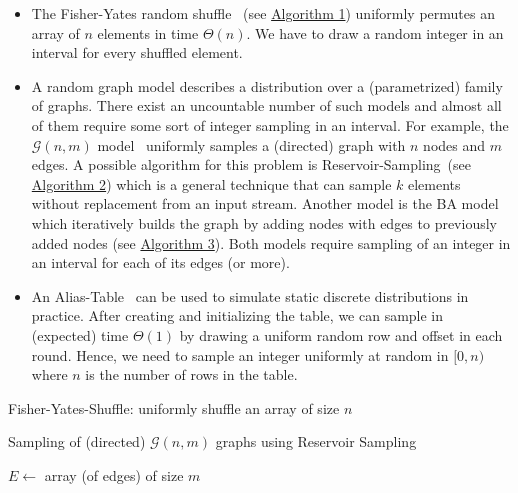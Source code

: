\documentclass[a4paper, UKenglish, cleveref, autoref, thm-restate]{lipics-v2021}
\begin{document}
\begin{itemize}
    \item The Fisher-Yates random shuffle~\cite{FY} (see \hyperref[alg:fy]{Algorithm 1}) uniformly permutes an array of $n$ elements in time $\Theta(n)$. 
    We have to draw a random integer in an interval for every shuffled element.
    \item A random graph model describes a distribution over a (parametrized) family of graphs. 
    There exist an uncountable number of such models and almost all of them require some sort of integer sampling in an interval. 
    For example, the $\mathcal{G}(n,m)$ model~\cite{GNM} uniformly samples a (directed) graph with $n$ nodes and $m$ edges. 
    A possible algorithm for this problem is Reservoir-Sampling~\cite{Reservoir}(see \hyperref[alg:gnm]{Algorithm 2}) which is a general technique that can sample $k$ elements without replacement from an input stream. 
    Another model is the BA model~\cite{BABook,BA} which iteratively builds the graph by adding nodes with edges to previously added nodes (see \hyperref[alg:ba]{Algorithm 3}). 
    Both models require sampling of an integer in an interval for each of its edges (or more).
    \item An Alias-Table~\cite{Alias} can be used to simulate static discrete distributions in practice. 
    After creating and initializing the table, we can sample in (expected) time $\Theta(1)$ by drawing a uniform random row and offset in each round. 
    Hence, we need to sample an integer uniformly at random in $[0,n)$ where $n$ is the number of rows in the table.
\end{itemize}


\begin{algorithm}[!htb] \label{alg:fy}
    \caption{Fisher-Yates-Shuffle: uniformly shuffle an array of size $n$}
\end{algorithm}


\begin{algorithm}[!htb] \label{alg:gnm}
    \caption{Sampling of (directed) $\mathcal{G}(n,m)$ graphs using Reservoir Sampling}
    $E \leftarrow$ array (of edges) of size $m$\;
    \;
\end{algorithm}
\end{document}
